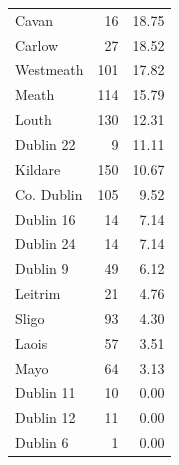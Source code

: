 \documentclass[a4paper,11pt,twoside]{article}
\begin{document}
\begin{longtable}{lrr}
Cavan & 16 & 18.75\\[0pt]
Carlow & 27 & 18.52\\[0pt]
Westmeath & 101 & 17.82\\[0pt]
Meath & 114 & 15.79\\[0pt]
Louth & 130 & 12.31\\[0pt]
Dublin 22 & 9 & 11.11\\[0pt]
Kildare & 150 & 10.67\\[0pt]
Co. Dublin & 105 & 9.52\\[0pt]
Dublin 16 & 14 & 7.14\\[0pt]
Dublin 24 & 14 & 7.14\\[0pt]
Dublin 9 & 49 & 6.12\\[0pt]
Leitrim & 21 & 4.76\\[0pt]
Sligo & 93 & 4.30\\[0pt]
Laois & 57 & 3.51\\[0pt]
Mayo & 64 & 3.13\\[0pt]
Dublin 11 & 10 & 0.00\\[0pt]
Dublin 12 & 11 & 0.00\\[0pt]
Dublin 6 & 1 & 0.00\\[0pt]
\end{longtable}
\end{document}
